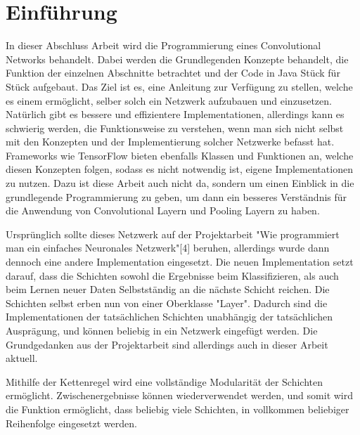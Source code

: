 \documentclass[12pt]{article}
\begin{document}
\cleardoublepage
\thispagestyle{empty}
\tableofcontents
\thispagestyle{empty}
\cleardoublepage


\section{Einführung}
In dieser Abschluss Arbeit wird die Programmierung eines Convolutional Networks  behandelt. Dabei werden die Grundlegenden Konzepte behandelt, die Funktion der einzelnen Abschnitte betrachtet und der Code in Java Stück für Stück aufgebaut. Das Ziel ist es, eine Anleitung zur Verfügung zu stellen, welche es einem ermöglicht, selber solch ein Netzwerk aufzubauen und einzusetzen. Natürlich gibt es bessere und effizientere Implementationen, allerdings kann es schwierig werden, die Funktionsweise zu verstehen, wenn man sich nicht selbst mit den Konzepten und der Implementierung solcher Netzwerke befasst hat. Frameworks wie TensorFlow bieten ebenfalls Klassen und Funktionen an, welche diesen Konzepten folgen, sodass es nicht notwendig ist, eigene Implementationen zu nutzen. Dazu ist diese Arbeit auch nicht da, sondern um einen Einblick in die grundlegende Programmierung zu geben, um dann ein besseres Verständnis für die Anwendung von Convolutional Layern und Pooling Layern zu haben.

Ursprünglich sollte dieses Netzwerk auf der Projektarbeit "Wie programmiert man ein einfaches Neuronales Netzwerk"[4] beruhen, allerdings wurde dann dennoch eine andere Implementation eingesetzt. Die neuen Implementation setzt darauf, dass die Schichten sowohl die Ergebnisse beim Klassifizieren, als auch beim Lernen neuer Daten Selbstständig an die nächste Schicht reichen. Die Schichten selbst erben nun von einer Oberklasse "Layer". Dadurch sind die Implementationen der tatsächlichen Schichten unabhängig der tatsächlichen Ausprägung, und können beliebig in ein Netzwerk eingefügt werden. Die Grundgedanken aus der Projektarbeit sind allerdings auch in dieser Arbeit aktuell.

Mithilfe der Kettenregel wird eine vollständige Modularität der Schichten ermöglicht. Zwischenergebnisse können wiederverwendet werden, und somit wird die Funktion ermöglicht, dass beliebig viele Schichten, in vollkommen beliebiger Reihenfolge eingesetzt werden. 
\end{document}
